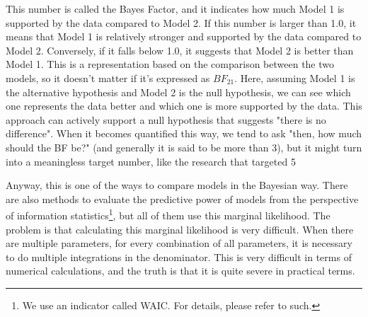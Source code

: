 \documentclass{ltjbook}
\begin{document}
This number is called the Bayes Factor, and it indicates how much Model 1 is supported by the data compared to Model 2. If this number is larger than 1.0, it means that Model 1 is relatively stronger and supported by the data compared to Model 2. Conversely, if it falls below 1.0, it suggests that Model 2 is better than Model 1. This is a representation based on the comparison between the two models, so it doesn't matter if it's expressed as $BF_{21}$. Here, assuming Model 1 is the alternative hypothesis and Model 2 is the null hypothesis, we can see which one represents the data better and which one is more supported by the data. This approach can actively support a null hypothesis that suggests "there is no difference". When it becomes quantified this way, we tend to ask "then, how much should the BF be?" (and generally it is said to be more than 3), but it might turn into a meaningless target number, like the research that targeted 5%

Anyway, this is one of the ways to compare models in the Bayesian way. There are also methods to evaluate the predictive power of models from the perspective of information statistics\footnote{We use an indicator called WAIC. For details, please refer to \cite{Hamada201912} such.}, but all of them use this marginal likelihood. The problem is that calculating this marginal likelihood is very difficult. When there are multiple parameters, for every combination of all parameters, it is necessary to do multiple integrations in the denominator. This is very difficult in terms of numerical calculations, and the truth is that it is quite severe in practical terms.
\end{document}
